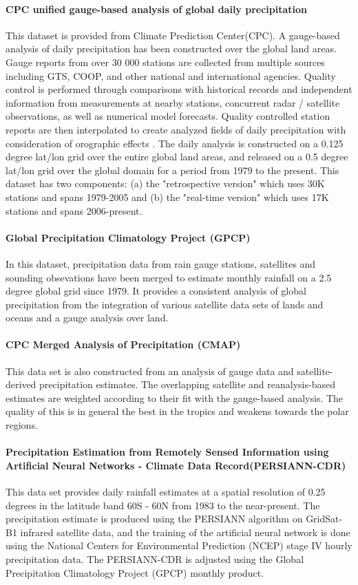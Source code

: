 \paragraph{CPC unified gauge-based analysis of global daily precipitation}
This dataset is provided from Climate Prediction Center(CPC). A gauge-based analysis of daily precipitation has been constructed over the global land areas. Gauge reports from over 30 000 stations are collected from multiple sources including GTS, COOP, and other national and international agencies. Quality control is performed through comparisons with historical records and independent information from measurements at nearby stations, concurrent radar / satellite observations, as well as numerical model forecasts. Quality controlled station reports are then interpolated to create analyzed fields of daily precipitation with consideration of orographic effects \cite{xie2007gauge}. The daily analysis is constructed on a 0.125 degree lat/lon grid over the entire global land areas, and released on a 0.5 degree lat/lon grid over the global domain for a period from 1979 to the present.\cite{xie2010cpc} This dataset has two components: (a) the "retrospective version" which uses 30K stations and spans 1979-2005 and (b) the "real-time version" which uses 17K stations and spans 2006-present.
\paragraph{Global Precipitation Climatology Project (GPCP)}
In this dataset, precipitation data from rain gauge stations, satellites and sounding obsevations have been merged to estimate monthly rainfall on a 2.5 degree global grid since 1979. It provides a consistent analysis of global precipitation from the integration of various satellite data sets of lands and oceans and a gauge analysis over land. 
\paragraph{CPC Merged Analysis of Precipitation (CMAP)}
This data set is also constructed from an analysis of gauge data and satellite-derived precipitation estimates. The overlapping satellite and reanalysis-based estimates are weighted according to their fit with the gauge-based analysis. The quality of this is in general the best in the tropics and weakens towards the polar regions. 
\paragraph{Precipitation Estimation from Remotely Sensed Information using Artificial Neural Networks - Climate Data Record(PERSIANN-CDR)}
This data set provides daily rainfall estimates at a spatial resolution of 0.25 degrees in the latitude band 60S - 60N from 1983 to the near-present. The precipitation estimate is produced using the PERSIANN algorithm on GridSat-B1 infrared satellite data, and the training of the artificial neural network is done using the National Centers for Environmental Prediction (NCEP) stage IV hourly precipitation data. The PERSIANN-CDR is adjusted using the Global Precipitation Climatology Project (GPCP) monthly product.
